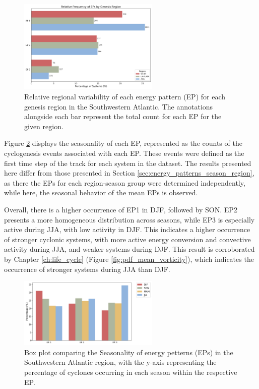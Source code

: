 \begin{figure}[!htbp]
    \centering
    \includegraphics[width=0.6\textwidth]{figs_6/ep_frequencies_by_region.png}
    \caption[Energy Patterns - Frequency by Region]{Relative regional variability of each energy pattern (EP) for each genesis region in the Southwestern Atlantic. The annotations alongside each bar represent the total count for each EP for the given region.}
    \label{fig:ep_frequencies_by_region}
\end{figure}

Figure \ref{fig:lps_seasonality} displays the seasonality of each EP, represented as the counts of the cyclogenesis events associated with each EP. These events were defined as the first time step of the track for each system in the dataset. The results presented here differ from those presented in Section \ref{sec:energy_patterns_season_region}, as there the EPs for each region-season group were determined independently, while here, the seasonal behavior of the mean EPs is observed. 

Overall, there is a higher occurrence of EP1 in DJF, followed by SON. EP2 presents a more homogeneous distribution across seasons, while EP3 is especially active during JJA, with low activity in DJF. This indicates a higher occurrence of stronger cyclonic systems, with more active energy conversion and convective activity during JJA, and weaker systems during DJF. This result is corroborated by Chapter \ref{ch:life_cycle} (Figure \ref{fig:pdf_mean_vorticity}), which indicates the occurrence of stronger systems during JJA than DJF.


\begin{figure}[!htbp]
    \centering
    \includegraphics[width=0.6\textwidth]{figs_6/lps_seasonality.png}
    \caption[Energy Patterns - Seasonality]{Box plot comparing the Seasonality of energy petterns (EPs) in the Southwestern Atlantic region, with the y-axis representing the percentage of cyclones occurring in each season within the respective EP.}
    \label{fig:lps_seasonality}
\end{figure}

